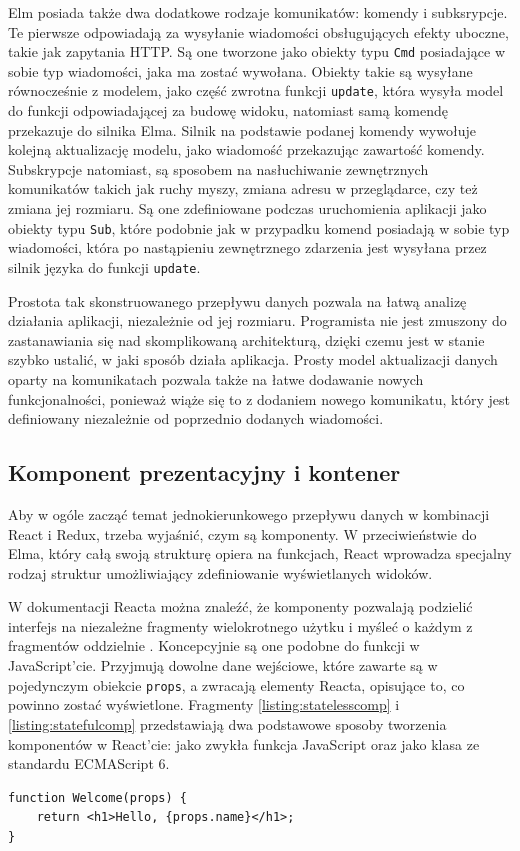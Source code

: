 Elm posiada także dwa dodatkowe rodzaje komunikatów: komendy i subksrypcje. Te pierwsze odpowiadają za wysyłanie wiadomości obsługujących efekty uboczne, takie jak zapytania HTTP. Są one tworzone jako obiekty typu \lstinline[style=elm-style]{Cmd} posiadające w sobie typ wiadomości, jaka ma zostać wywołana. Obiekty takie są wysyłane równocześnie z modelem, jako część zwrotna funkcji \lstinline{update}, która wysyła model do funkcji odpowiadającej za budowę widoku, natomiast samą komendę przekazuje do silnika Elma. Silnik na podstawie podanej komendy wywołuje kolejną aktualizację modelu, jako wiadomość przekazując zawartość komendy. Subskrypcje natomiast, są sposobem na nasłuchiwanie zewnętrznych komunikatów takich jak ruchy myszy, zmiana adresu w przeglądarce, czy też zmiana jej rozmiaru. Są one zdefiniowane podczas uruchomienia aplikacji jako obiekty typu \lstinline[style=elm-style]{Sub}, które podobnie jak w przypadku komend posiadają w sobie typ wiadomości, która po nastąpieniu zewnętrznego zdarzenia jest wysyłana przez silnik języka do funkcji \lstinline{update}.

Prostota tak skonstruowanego przepływu danych pozwala na łatwą analizę działania aplikacji, niezależnie od jej rozmiaru. Programista nie jest zmuszony do zastanawiania się nad skomplikowaną architekturą, dzięki czemu jest w stanie szybko ustalić, w jaki sposób działa aplikacja. Prosty model aktualizacji danych oparty na komunikatach pozwala także na łatwe dodawanie nowych funkcjonalności, ponieważ wiąże się to z dodaniem nowego komunikatu, który jest definiowany niezależnie od poprzednio dodanych wiadomości.

\subsection{Komponent prezentacyjny i kontener}
Aby w ogóle zacząć temat jednokierunkowego przepływu danych w kombinacji React i Redux, trzeba wyjaśnić, czym są komponenty. W przeciwieństwie do Elma, który całą swoją strukturę opiera na funkcjach, React wprowadza specjalny rodzaj struktur umożliwiający zdefiniowanie wyświetlanych widoków.

W dokumentacji Reacta można znaleźć, że komponenty pozwalają podzielić interfejs na niezależne fragmenty wielokrotnego użytku i myśleć o każdym z fragmentów oddzielnie \cite{reactDocs}. Koncepcyjnie są one podobne do funkcji w JavaScript'cie. Przyjmują dowolne dane wejściowe, które zawarte są w pojedynczym obiekcie \lstinline{props}, a zwracają elementy Reacta, opisujące to, co powinno zostać wyświetlone. Fragmenty \ref{listing:statelesscomp} i \ref{listing:statefulcomp} przedstawiają dwa podstawowe sposoby tworzenia komponentów w React'cie: jako zwykła funkcja JavaScript oraz jako klasa ze standardu ECMAScript 6.
\newpage %
\begin{lstlisting}[style=JavaScript, caption=Funkcyjny komponent bezstanowy, label=listing:statelesscomp]
function Welcome(props) {
	return <h1>Hello, {props.name}</h1>;
}
\end{lstlisting}

